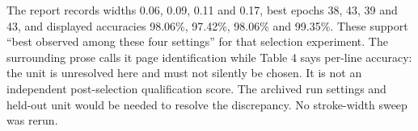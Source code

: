 The report records widths 0.06, 0.09, 0.11 and 0.17, best epochs 38, 43,
39 and 43, and displayed accuracies 98.06\%, 97.42\%, 98.06\% and
99.35\%. These support ``best observed among these four settings'' for
that selection experiment. The surrounding prose calls it page identification
while Table 4 says per-line accuracy: the unit is unresolved here and must
not silently be chosen. It is not an independent post-selection qualification
score. The archived run settings and held-out unit would be needed to resolve
the discrepancy. No stroke-width sweep was rerun.
